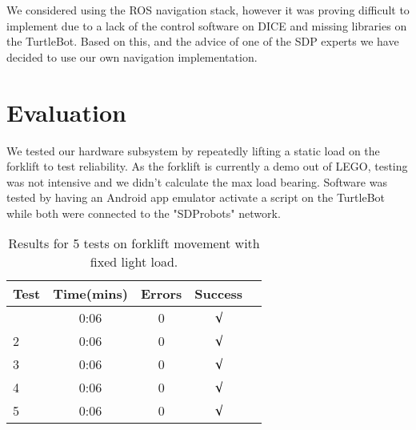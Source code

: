 \documentclass{article}
\begin{document}
We considered using the ROS navigation stack, however it was proving difficult to implement due to a lack of the control software on DICE and missing libraries on the TurtleBot. 
Based on this, and the advice of one of the SDP experts we have decided to use our own navigation implementation.

\section{Evaluation}

We tested our hardware subsystem by repeatedly lifting a static load on the forklift to test reliability. As the forklift is currently a demo out of LEGO, testing was not intensive and we didn't calculate the max load bearing.
Software was tested by having an Android app emulator activate a script on the TurtleBot while both were connected to the "SDProbots" network.

\begin{table}[h]
    \vskip 3mm
    \begin{center}
    \begin{small}
    \begin{sc}
    \begin{tabular}{lcccr}
    \hline
    \abovespace\belowspace
    Test  & Time(mins) & Errors & Success \\
    \hline
    \abovespace
    1    & 0:06 & 0 & $\surd$ \\
    2    & 0:06 & 0 & $\surd$\\
    3    & 0:06 & 0 & $\surd$ \\
    4    & 0:06 & 0 & $\surd$\\
    5    & 0:06 & 0 & $\surd$ \\
    \hline
    \end{tabular}
    \end{sc}
    \end{small}
    \caption{Results for 5 tests on forklift movement with fixed light load.}
    \label{tab:sample-table}
    \end{center}
    \vskip -3mm
\end{table}
\end{document}
